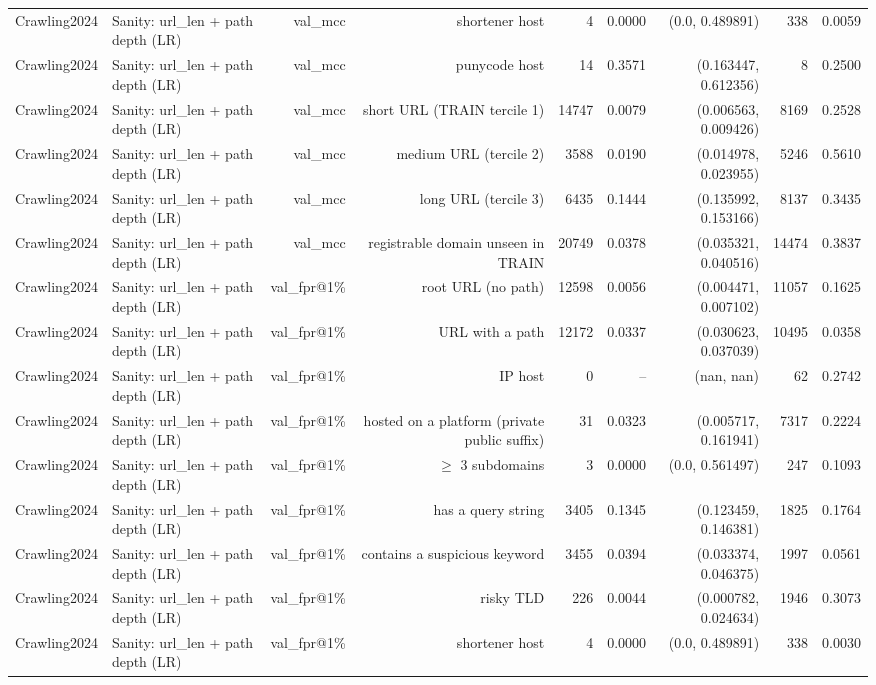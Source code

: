 \begin{table}[t]
\begin{tabular}{llrrrrrrr}
Crawling2024 & Sanity: url\_len + path depth (LR) & val\_mcc & shortener host & 4 & 0.0000 & (0.0, 0.489891) & 338 & 0.0059 \\
Crawling2024 & Sanity: url\_len + path depth (LR) & val\_mcc & punycode host & 14 & 0.3571 & (0.163447, 0.612356) & 8 & 0.2500 \\
Crawling2024 & Sanity: url\_len + path depth (LR) & val\_mcc & short URL (TRAIN tercile 1) & 14747 & 0.0079 & (0.006563, 0.009426) & 8169 & 0.2528 \\
Crawling2024 & Sanity: url\_len + path depth (LR) & val\_mcc & medium URL (tercile 2) & 3588 & 0.0190 & (0.014978, 0.023955) & 5246 & 0.5610 \\
Crawling2024 & Sanity: url\_len + path depth (LR) & val\_mcc & long URL (tercile 3) & 6435 & 0.1444 & (0.135992, 0.153166) & 8137 & 0.3435 \\
Crawling2024 & Sanity: url\_len + path depth (LR) & val\_mcc & registrable domain unseen in TRAIN & 20749 & 0.0378 & (0.035321, 0.040516) & 14474 & 0.3837 \\
Crawling2024 & Sanity: url\_len + path depth (LR) & val\_fpr@1\% & root URL (no path) & 12598 & 0.0056 & (0.004471, 0.007102) & 11057 & 0.1625 \\
Crawling2024 & Sanity: url\_len + path depth (LR) & val\_fpr@1\% & URL with a path & 12172 & 0.0337 & (0.030623, 0.037039) & 10495 & 0.0358 \\
Crawling2024 & Sanity: url\_len + path depth (LR) & val\_fpr@1\% & IP host & 0 & -- & (nan, nan) & 62 & 0.2742 \\
Crawling2024 & Sanity: url\_len + path depth (LR) & val\_fpr@1\% & hosted on a platform (private public suffix) & 31 & 0.0323 & (0.005717, 0.161941) & 7317 & 0.2224 \\
Crawling2024 & Sanity: url\_len + path depth (LR) & val\_fpr@1\% & $\geq$ 3 subdomains & 3 & 0.0000 & (0.0, 0.561497) & 247 & 0.1093 \\
Crawling2024 & Sanity: url\_len + path depth (LR) & val\_fpr@1\% & has a query string & 3405 & 0.1345 & (0.123459, 0.146381) & 1825 & 0.1764 \\
Crawling2024 & Sanity: url\_len + path depth (LR) & val\_fpr@1\% & contains a suspicious keyword & 3455 & 0.0394 & (0.033374, 0.046375) & 1997 & 0.0561 \\
Crawling2024 & Sanity: url\_len + path depth (LR) & val\_fpr@1\% & risky TLD & 226 & 0.0044 & (0.000782, 0.024634) & 1946 & 0.3073 \\
Crawling2024 & Sanity: url\_len + path depth (LR) & val\_fpr@1\% & shortener host & 4 & 0.0000 & (0.0, 0.489891) & 338 & 0.0030 \\

\end{tabular}
\end{table}
